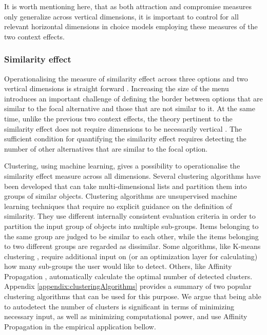 \documentclass[a4paper,12pt]{article}
\begin{document}
 It is worth mentioning here, that as both attraction and compromise measures only generalize across vertical dimensions, it is important to control for all relevant horizontal dimensions in choice models employing these measures of the two context effects.

 \subsubsection{Similarity effect}

 Operationalising the measure of similarity effect across three options and two vertical dimensions is straight forward \citep{roodrkerkEtAl11}. Increasing the size of the menu introduces an important challenge of defining the border between options that are similar to the focal alternative and those that are not similar to it. At the same time, unlike the previous two context effects, the theory pertinent to the similarity effect does not require dimensions to be necessarily vertical \citep{tversky1972elimination}. The sufficient condition for quantifying the similarity effect requires detecting the number of other alternatives that are similar to the focal option.

 Clustering, using machine learning, gives a possibility to operationalise the similarity effect measure across all dimensions. Several clustering algorithms have been developed that can take multi-dimensional lists and partition them into groups of similar objects. Clustering algorithms are unsupervised machine learning techniques that require no explicit guidance on the definition of similarity. They use different internally consistent evaluation criteria in order to partition the input group of objects into multiple sub-groups. Items belonging to the same group are judged to be similar to each other, while the items belonging to two different groups are regarded as dissimilar. Some algorithms, like K-means clustering \citep{lloyd82}, require additional input on (or an optimization layer for calculating) how many sub-groups the user would like to detect. Others, like Affinity Propagation \citep{freyDueck07}, automatically calculate the optimal number of detected clusters. Appendix \ref{appendix:clusteringAlgorithms} provides a summary of two popular clustering algorithms that can be used for this purpose. We argue that being able to autodetect the number of clusters is significant in terms of minimizing necessary input, as well as minimizing computational power, and use Affinity Propagation in the empirical application bellow. 
\end{document}
